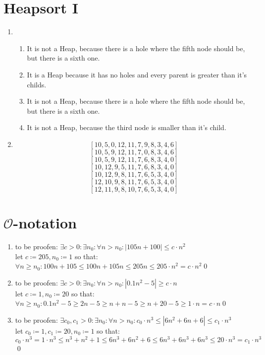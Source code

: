 \documentclass[sectionformat = exercise]{gadsescript}
\begin{document}
\maketitle
\section{Heapsort I}
\begin{enumerate}[label=\alph*)]
	\item 
		\begin{enumerate}[label=\Alph*.]
			\item It is not a Heap, because there is a hole where the fifth node should be, but there is a sixth one.
			\item It is a Heap because it has no holes and every parent is greater than it's childs.
			\item It is not a Heap, because there is a hole where the fifth node should be, but there is a sixth one.
			\item It is not a Heap, because the third node is smaller than it's child.
		\end{enumerate}
	\item 
		\[ [10,  5, 0,  12, 11, 7, 9,  8, 3, 4, 6] \]
		\[ [10,  5, 9,  12, 11, 7, 0,  8, 3, 4, 6] \]
		\[ [10,  5, 9,  12, 11, 7, 6,  8, 3, 4, 0] \]
		\[ [10,  12, 9,  5, 11, 7, 6,  8, 3, 4, 0] \]
		\[ [10,  12, 9,  8, 11, 7, 6,  5, 3, 4, 0] \]
		\[ [12,  10, 9,  8, 11, 7, 6,  5, 3, 4, 0] \]
		\[ [12,  11, 9,  8, 10, 7, 6,  5, 3, 4, 0] \]
\end{enumerate}

\section{$\mathcal{O}$-notation}
\begin{enumerate}[label=\alph*)]
	\item to be proofen: $ \exists c > 0 : \exists n_0 : \forall n > n_0 : |105n + 100| \leq c \cdot n^2$\\
		let $ c \coloneqq 205, n_0 \coloneqq 1 $ so that:\\
		$ \forall n \geq n_0: 100 n + 105 \leq 100n + 105n \leq 205n \leq 205 \cdot n^2 = c \cdot n^2 $\qed
	\item to be proofen: $ \exists c > 0 : \exists n_0 : \forall n > n_0 : |0.1n^2 -5| \geq c \cdot n$\\
		let $ c \coloneqq 1, n_0 \coloneqq 20 $ so that:\\
		$ \forall n \geq n_0: 0.1 n^2 - 5 \geq 2 n - 5 \geq n + n - 5 \geq n + 20 - 5 \geq 1 \cdot n = c \cdot n $\qed
	\item to be proofen: $ \exists c_0, c_1 > 0 : \exists n_0 : \forall n > n_0 : c_0 \cdot n^3 \leq |6n^2 + 6n + 6| \leq c_1 \cdot n^3$\\
		let $ c_0 \coloneqq 1, c_1 \coloneqq 20, n_0 \coloneqq 1 $ so that:\\
		$ c_0 \cdot n^3 = 1 \cdot n^3 \leq n^3 + n^2 + 1 \leq 6n^3 + 6n^2 + 6 \leq 6n^3 + 6n^3 + 6n^3 \leq 20 \cdot n^3 = c_1 \cdot n^3 $\qed
\end{enumerate}
\end{document}

